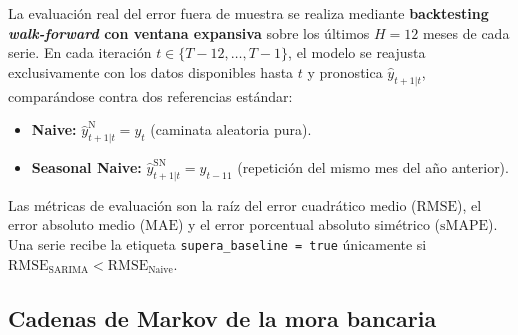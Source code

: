 \documentclass[11pt,letterpaper]{article}
\begin{document}
La evaluación real del error fuera de muestra se realiza mediante \textbf{backtesting \emph{walk-forward} con ventana expansiva} sobre los últimos \(H = 12\) meses de cada serie. En cada iteración \(t \in \{T-12, \dots, T-1\}\), el modelo se reajusta exclusivamente con los datos disponibles hasta \(t\) y pronostica \(\hat{y}_{t+1|t}\), comparándose contra dos referencias estándar:
\begin{itemize}[leftmargin=1.5em]
  \item \textbf{Naive:} \(\hat{y}_{t+1|t}^{\text{N}} = y_t\) (caminata aleatoria pura).
  \item \textbf{Seasonal Naive:} \(\hat{y}_{t+1|t}^{\text{SN}} = y_{t-11}\) (repetición del mismo mes del año anterior).
\end{itemize}
Las métricas de evaluación son la raíz del error cuadrático medio (\(\text{RMSE}\)), el error absoluto medio (\(\text{MAE}\)) y el error porcentual absoluto simétrico (\(\text{sMAPE}\)). Una serie recibe la etiqueta \texttt{supera\_baseline = true} únicamente si \(\text{RMSE}_{\text{SARIMA}} < \text{RMSE}_{\text{Naive}}\).

\subsection{Cadenas de Markov de la mora bancaria}
\end{document}
